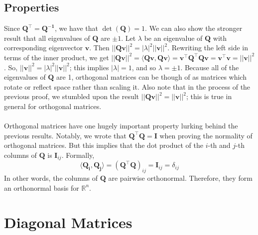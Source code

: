 \documentclass{article}
\begin{document}
\subsection{Properties}
Since $\mathbf{Q^{\top}} = \mathbf{Q^{-1}}$, we have that $\det(\mathbf{Q}) = 1$. We can also show the stronger result that all eigenvalues of $\mathbf{Q}$ are $\pm 1$. Let $\lambda$ be an eigenvalue of $\mathbf{Q}$ with corresponding eigenvector $\mathbf{v}$. Then $||\mathbf{Qv}||^2 = |\lambda|^2||\mathbf{v}||^2$. Rewriting the left side in terms of the inner product, we get $||\mathbf{Qv}||^2 = \langle \mathbf{Qv}, \mathbf{Qv} \rangle = \mathbf{v^{\top}Q^{\top}Qv} = \mathbf{v^{\top}v} = ||\mathbf{v}||^2$. So, $||\mathbf{v}||^2 = |\lambda|^2||\mathbf{v}||^2$; this implies $|\lambda| = 1$, and so $\lambda = \pm 1$. Because all of the eigenvalues of $\mathbf{Q}$ are 1, orthogonal matrices can be though of as matrices which rotate or reflect space rather than scaling it. Also note that in the process of the previous proof, we stumbled upon the result $||\mathbf{Qv}||^2  = ||\mathbf{v}||^2$; this is true in general for orthogonal matrices.\\\\
Orthogonal matrices have one hugely important property lurking behind the previous results. Notably, we wrote that $\mathbf{Q^{\top}Q} = \mathbf{I}$ when proving the normality of orthogonal matrices. But this implies that the dot product of the $i$-th and $j$-th columns of $\mathbf{Q}$ is $\mathbf{I}_{ij}$. Formally, $$\langle \mathbf{Q_i, Q_j} \rangle = \mathbf{(Q^{\top}Q)}_{ij} = \mathbf{I}_{ij} = \delta_{ij}$$ In other words, the columns of $\mathbf{Q}$ are pairwise orthonormal. Therefore, they form an orthonormal basis for $\mathbb{R}^n$.

\section{Diagonal Matrices}
\end{document}
